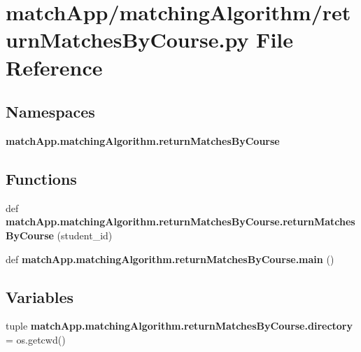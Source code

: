 \section{match\+App/matching\+Algorithm/return\+Matches\+By\+Course.py File Reference}
\label{return_matches_by_course_8py}
\subsection*{Namespaces}
\begin{DoxyCompactItemize}
\item 
 {\bf match\+App.\+matching\+Algorithm.\+return\+Matches\+By\+Course}
\end{DoxyCompactItemize}
\subsection*{Functions}
\begin{DoxyCompactItemize}
\item 
def {\bf match\+App.\+matching\+Algorithm.\+return\+Matches\+By\+Course.\+return\+Matches\+By\+Course} (student\+\_\+id)
\item 
def {\bf match\+App.\+matching\+Algorithm.\+return\+Matches\+By\+Course.\+main} ()
\end{DoxyCompactItemize}
\subsection*{Variables}
\begin{DoxyCompactItemize}
\item 
tuple {\bf match\+App.\+matching\+Algorithm.\+return\+Matches\+By\+Course.\+directory} = os.\+getcwd()
\end{DoxyCompactItemize}
